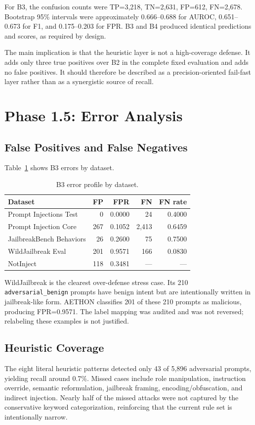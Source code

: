\documentclass[11pt,a4paper]{article}
\begin{document}
For B3, the confusion counts were TP=3,218, TN=2,631, FP=612, FN=2,678. Bootstrap 95\% intervals were approximately 0.666--0.688 for AUROC, 0.651--0.673 for F1, and 0.175--0.203 for FPR. B3 and B4 produced identical predictions and scores, as required by design.

The main implication is that the heuristic layer is not a high-coverage defense. It adds only three true positives over B2 in the complete fixed evaluation and adds no false positives. It should therefore be described as a precision-oriented fail-fast layer rather than as a synergistic source of recall.

\section{Phase 1.5: Error Analysis}
\subsection{False Positives and False Negatives}
Table~\ref{tab:error} shows B3 errors by dataset.

\begin{table}[H]
\centering
\caption{B3 error profile by dataset.}
\label{tab:error}
\begin{tabular}{lrrrr}
\toprule
Dataset & FP & FPR & FN & FN rate \\
\midrule
Prompt Injections Test & 0 & 0.0000 & 24 & 0.4000 \\
Prompt Injection Core & 267 & 0.1052 & 2,413 & 0.6459 \\
JailbreakBench Behaviors & 26 & 0.2600 & 75 & 0.7500 \\
WildJailbreak Eval & 201 & 0.9571 & 166 & 0.0830 \\
NotInject & 118 & 0.3481 & --- & --- \\
\bottomrule
\end{tabular}
\end{table}

WildJailbreak is the clearest over-defense stress case. Its 210 \texttt{adversarial\_benign} prompts have benign intent but are intentionally written in jailbreak-like form. AETHON classifies 201 of these 210 prompts as malicious, producing FPR=0.9571. The label mapping was audited and was not reversed; relabeling these examples is not justified.

\subsection{Heuristic Coverage}
The eight literal heuristic patterns detected only 43 of 5,896 adversarial prompts, yielding recall around 0.7\%. Missed cases include role manipulation, instruction override, semantic reformulation, jailbreak framing, encoding/obfuscation, and indirect injection. Nearly half of the missed attacks were not captured by the conservative keyword categorization, reinforcing that the current rule set is intentionally narrow.
\end{document}
